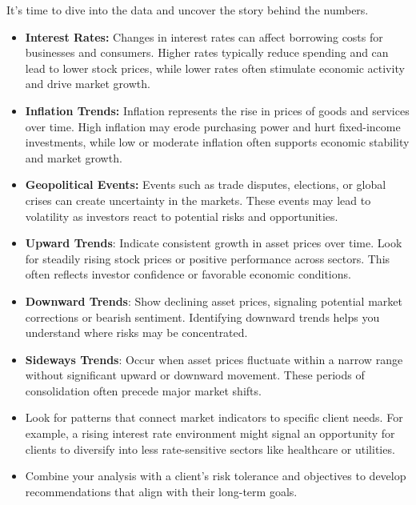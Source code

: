 \documentclass[11pt]{article}
\begin{document}
It's time to dive into the data and uncover the story behind the numbers.


\begin{itemize}[leftmargin=1.5em, itemsep=2pt]
  \item \textbf{Interest Rates:} Changes in interest rates can affect
  borrowing costs for businesses and consumers. Higher rates typically reduce
  spending and can lead to lower stock prices, while lower rates often
  stimulate economic activity and drive market growth.
  \item \textbf{Inflation Trends:} Inflation represents the rise in prices of
  goods and services over time. High inflation may erode purchasing power and
  hurt fixed-income investments, while low or moderate inflation often
  supports economic stability and market growth.
  \item \textbf{Geopolitical Events:} Events such as trade disputes,
  elections, or global crises can create uncertainty in the markets. These
  events may lead to volatility as investors react to potential risks and
  opportunities.
\end{itemize}

\begin{itemize}[leftmargin=1.5em, itemsep=2pt]
  \item \textbf{Upward Trends}: Indicate consistent growth in asset prices
  over time. Look for steadily rising stock prices or positive performance
  across sectors. This often reflects investor confidence or favorable
  economic conditions.
  \item \textbf{Downward Trends}: Show declining asset prices, signaling
  potential market corrections or bearish sentiment. Identifying downward
  trends helps you understand where risks may be concentrated.
  \item \textbf{Sideways Trends}: Occur when asset prices fluctuate within a
  narrow range without significant upward or downward movement. These periods
  of consolidation often precede major market shifts.
\end{itemize}

\begin{itemize}[leftmargin=1.5em, itemsep=2pt]
  \item Look for patterns that connect market indicators to specific client
  needs. For example, a rising interest rate environment might signal an
  opportunity for clients to diversify into less rate-sensitive sectors like
  healthcare or utilities.
  \item Combine your analysis with a client's risk tolerance and objectives
  to develop recommendations that align with their long-term goals.
\end{itemize}
\end{document}
